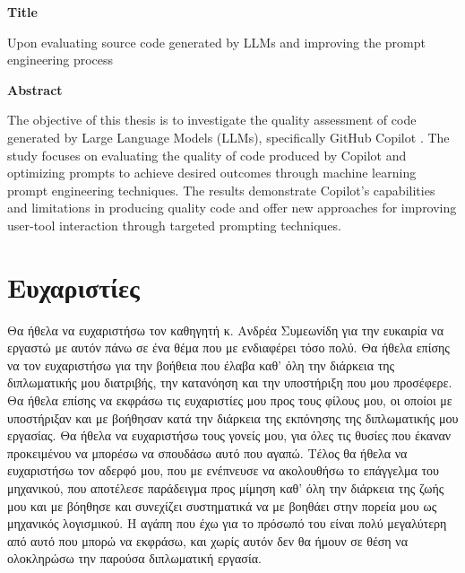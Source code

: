 \thispagestyle{empty}

\clearpage
\begin{center}
{\textbf{Title}} \\
\end{center}
\begin{center}
Upon evaluating source code generated by LLMs and improving the prompt engineering process \\[1cm]
\end{center}
\begin{center}
 \textbf{Abstract}
\end{center}

The objective of this thesis is to investigate the quality assessment of code generated by Large Language Models (LLMs), specifically GitHub Copilot \cite{githubcopilot}. The study focuses on evaluating the quality of code produced by Copilot and optimizing prompts to achieve desired outcomes through machine learning prompt engineering techniques. The results demonstrate Copilot's capabilities and limitations in producing quality code and offer new approaches for improving user-tool interaction through targeted prompting techniques.

\clearpage


\section*{Ευχαριστίες} \thispagestyle{empty}
Θα ήθελα να ευχαριστήσω τον καθηγητή κ. Ανδρέα Συμεωνίδη για την ευκαιρία να εργαστώ με αυτόν πάνω σε ένα θέμα που με ενδιαφέρει τόσο πολύ. Θα ήθελα επίσης να τον ευχαριστήσω για την βοήθεια που έλαβα καθ' όλη την διάρκεια της διπλωματικής μου διατριβής, την κατανόηση και την υποστήριξη που μου προσέφερε.
Θα ήθελα επίσης να εκφράσω τις ευχαριστίες μου προς τους φίλους μου, οι οποίοι με υποστήριξαν και με βοήθησαν κατά την διάρκεια της εκπόνησης της διπλωματικής μου εργασίας.
Θα ήθελα να ευχαριστήσω τους γονείς μου, για όλες τις θυσίες που έκαναν προκειμένου να μπορέσω να σπουδάσω αυτό που αγαπώ.
Τέλος θα ήθελα να ευχαριστήσω τον αδερφό μου, που με ενέπνευσε να ακολουθήσω το επάγγελμα του μηχανικού, που αποτέλεσε παράδειγμα προς μίμηση καθ' όλη την διάρκεια της ζωής μου και με βόηθησε και συνεχίζει συστηματικά να με βοηθάει στην πορεία μου ως μηχανικός λογισμικού. Η αγάπη που έχω για το πρόσωπό του είναι πολύ μεγαλύτερη από αυτό που μπορώ να εκφράσω, και χωρίς αυτόν δεν θα ήμουν σε θέση να ολοκληρώσω την παρούσα διπλωματική εργασία.
